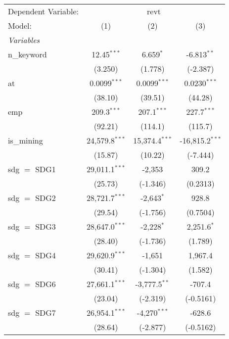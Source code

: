 
\begingroup
\centering
\begin{tabular}{lccc}
   \tabularnewline \midrule \midrule
   Dependent Variable: & \multicolumn{3}{c}{revt}\\
   Model:        & (1)              & (2)              & (3)\\  
   \midrule
   \emph{Variables}\\
   n\_keyword    & 12.45$^{***}$    & 6.659$^{*}$      & -6.813$^{**}$\\   
                 & (3.250)          & (1.778)          & (-2.387)\\   
   at            & 0.0099$^{***}$   & 0.0099$^{***}$   & 0.0230$^{***}$\\   
                 & (38.10)          & (39.51)          & (44.28)\\   
   emp           & 209.3$^{***}$    & 207.1$^{***}$    & 227.7$^{***}$\\   
                 & (92.21)          & (114.1)          & (115.7)\\   
   is\_mining    & 24,579.8$^{***}$ & 15,374.4$^{***}$ & -16,815.2$^{***}$\\   
                 & (15.87)          & (10.22)          & (-7.444)\\   
   sdg $=$ SDG1  & 29,011.1$^{***}$ & -2,353           & 309.2\\   
                 & (25.73)          & (-1.346)         & (0.2313)\\   
   sdg $=$ SDG2  & 28,721.7$^{***}$ & -2,643$^{*}$     & 928.8\\   
                 & (29.54)          & (-1.756)         & (0.7504)\\   
   sdg $=$ SDG3  & 28,647.0$^{***}$ & -2,228$^{*}$     & 2,251.6$^{*}$\\   
                 & (28.40)          & (-1.736)         & (1.789)\\   
   sdg $=$ SDG4  & 29,620.9$^{***}$ & -1,651           & 1,967.4\\   
                 & (30.41)          & (-1.304)         & (1.582)\\   
   sdg $=$ SDG6  & 27,661.1$^{***}$ & -3,777.5$^{**}$  & -707.4\\   
                 & (23.04)          & (-2.319)         & (-0.5161)\\   
   sdg $=$ SDG7  & 26,954.1$^{***}$ & -4,270$^{***}$   & -628.6\\   
                 & (28.64)          & (-2.877)         & (-0.5162)\\   

\end{tabular}
